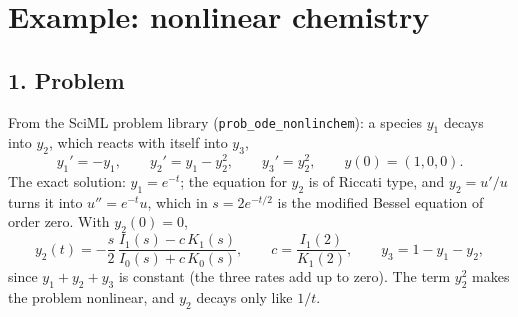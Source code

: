 \documentclass[11pt,a4paper]{article}
\begin{document}
\section*{Example: nonlinear chemistry}

\subsection*{1. Problem}
From the SciML problem library (\texttt{prob\_ode\_nonlinchem}): a species
$y_1$ decays into $y_2$, which reacts with itself into $y_3$,
\begin{equation*}
  y_1' = -y_1, \qquad
  y_2' = y_1 - y_2^2, \qquad
  y_3' = y_2^2, \qquad
  y(0) = (1, 0, 0).
\end{equation*}
The exact solution: $y_1 = e^{-t}$; the equation for $y_2$ is of Riccati
type, and $y_2 = u'/u$ turns it into $u'' = e^{-t}u$, which in
$s = 2e^{-t/2}$ is the modified Bessel equation of order zero. With
$y_2(0) = 0$,
\begin{equation*}
  y_2(t) = -\frac{s}{2}\,
  \frac{I_1(s) - c\,K_1(s)}{I_0(s) + c\,K_0(s)},
  \qquad c = \frac{I_1(2)}{K_1(2)},
  \qquad y_3 = 1 - y_1 - y_2 ,
\end{equation*}
since $y_1 + y_2 + y_3$ is constant (the three rates add up to zero). The
term $y_2^2$ makes the problem nonlinear, and $y_2$ decays only like $1/t$.
\begin{center}
\small

\end{center}
\end{document}
